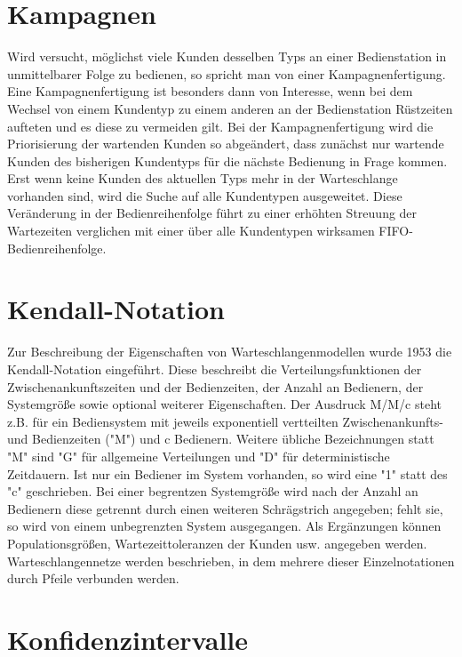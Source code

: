 \section*{Kampagnen}


Wird versucht, möglichst viele Kunden desselben Typs an einer Bedienstation
in unmittelbarer Folge zu bedienen, so spricht man von einer Kampagnenfertigung. Eine Kampagnenfertigung ist
besonders dann von Interesse, wenn bei dem Wechsel von einem Kundentyp zu einem anderen an der Bedienstation
Rüstzeiten aufteten und es diese zu vermeiden gilt. Bei der Kampagnenfertigung wird die Priorisierung der
wartenden Kunden so abgeändert, dass zunächst nur wartende Kunden des bisherigen Kundentyps für die nächste
Bedienung in Frage kommen. Erst wenn keine Kunden des aktuellen Typs mehr in der Warteschlange vorhanden sind,
wird die Suche auf alle Kundentypen ausgeweitet. Diese Veränderung in der Bedienreihenfolge führt zu einer
erhöhten Streuung der Wartezeiten verglichen mit einer über alle Kundentypen wirksamen FIFO-Bedienreihenfolge.

\section*{Kendall-Notation}


Zur Beschreibung der Eigenschaften von Warteschlangenmodellen wurde 1953 die Kendall-Notation eingeführt.
Diese beschreibt die Verteilungsfunktionen der Zwischenankunftszeiten und der Bedienzeiten, der Anzahl an
Bedienern, der Systemgröße sowie optional weiterer Eigenschaften. Der Ausdruck M/M/c steht z.B. für ein
Bediensystem mit jeweils exponentiell vertteilten Zwischenankunfts- und Bedienzeiten ("M") und c Bedienern.
Weitere übliche Bezeichnungen statt "M" sind "G" für allgemeine Verteilungen und "D" für deterministische
Zeitdauern. Ist nur ein Bediener im System vorhanden, so wird eine "1" statt des "c" geschrieben. Bei einer
begrentzen Systemgröße wird nach der Anzahl an Bedienern diese getrennt durch einen weiteren Schrägstrich
angegeben; fehlt sie, so wird von einem unbegrenzten System ausgegangen. Als Ergänzungen können Populationsgrößen,
Wartezeittoleranzen der Kunden usw. angegeben werden. Warteschlangennetze werden beschrieben, in dem mehrere
dieser Einzelnotationen durch Pfeile verbunden werden.

\section*{Konfidenzintervalle}


